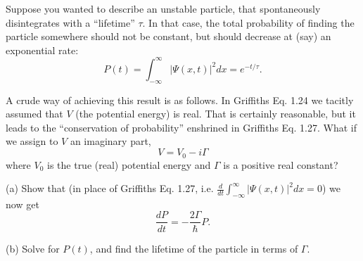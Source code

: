\documentclass{article}
\begin{document}
\newpage

\begin{ques}\label{q7}
Suppose you wanted to describe an unstable particle, that spontaneously disintegrates with
a “lifetime” $\tau$. In that case, the total probability of finding the particle somewhere should
not be constant, but should decrease at (say) an exponential rate:
\[
P (t) = \int_{-\infty}^{\infty} |\Psi(x, t)|^2 dx = e^{-t/\tau}.
\]

A crude way of achieving this result is as follows. In Griffiths Eq. 1.24 we tacitly assumed
that $V$ (the potential energy) is real. That is certainly reasonable, but it leads to the
“conservation of probability” enshrined in Griffiths Eq. 1.27. What if we assign to $V$ an
imaginary part,
\[
V = V_0 - i\Gamma
\]
where $V_0$ is the true (real) potential energy and $\Gamma$ is a positive real constant?

(a) Show that (in place of Griffiths Eq. 1.27, i.e.
$\tfrac{d}{dt}\int_{-\infty}^\infty |\Psi(x, t)|^2dx = 0$) we now get
\[
\frac{dP}{dt} = -\frac{2\Gamma}{\hbar}P.
\]

(b) Solve for $P(t)$, and find the lifetime of the particle in terms of $\Gamma$.
\end{ques}
\end{document}
